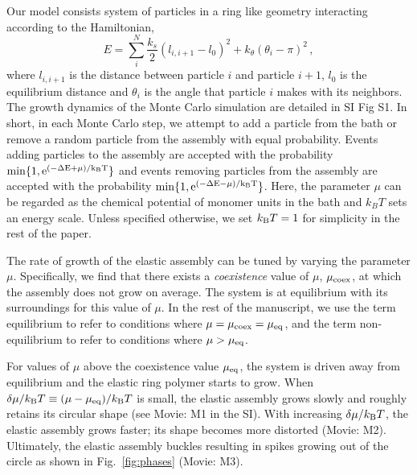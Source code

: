 \documentclass[amsmath,preprintnumbers,10pt,nofootinbib,prl,twocolumn]{revtex4-1}
\begin{document}
 Our model consists system of particles in a ring like geometry interacting according to the Hamiltonian, 
\begin{equation}
\label{eq:Halmitonianl}
E=\sum_i^N{\frac{k_s}{2}(l_{i,i+1}-l_0)^2+k_\theta(\theta_i-\pi)^2}\,,
\end{equation}
where $l_{i,i+1}$ is the distance between particle $i$ and particle $i+1$, $l_0$ is the equilibrium distance and $\theta_i$ is the angle that particle $i$ makes with its neighbors. The growth dynamics of the Monte Carlo simulation are detailed in SI Fig S1. In short, in each Monte Carlo step, we attempt to add a particle from the bath or remove a random particle from the assembly with equal probability.   Events adding particles to the assembly are accepted with the probability $\rm{min}\{1,e^{(-\Delta E +\mu)/k_{\rm B} T}\}$ and events removing particles from the assembly are accepted with the probability $\rm{min}\{1,e^{(-\Delta E -\mu)/k_{\rm B} T}\}$. Here, the parameter $\mu$ can be regarded as the chemical potential of monomer units in the bath and $k_B T$ sets an energy scale. Unless specified otherwise, we set $k_{\rm B} T = 1$ for simplicity in the rest of the paper. 

The rate of growth of the elastic assembly can be tuned by varying the parameter $\mu$. Specifically, we find that there exists a \textit{coexistence} value of $\mu$, $\mu_{\rm coex}$, at which the assembly does not grow on average. The system is at equilibrium with its surroundings for this value of $\mu$. In the rest of the manuscript, we use the term equilibrium to refer to conditions where $\mu =\mu_{\rm coex}=\mu_{\rm eq}$, and the term non-equilibrium to refer to conditions where $\mu > \mu_{\rm eq}$. 

For values of $\mu$ above the coexistence value $\mu_{\rm eq}$, the system is driven away from equilibrium and the elastic ring polymer starts to grow. When $\delta\mu/k_{\rm B}T \equiv (\mu-\mu_{\rm eq})/k_{\rm B} T$ is small, the elastic assembly grows slowly and roughly retains its circular shape (see Movie: M1 in the SI). With increasing $\delta\mu/k_{\rm B} T$, the elastic assembly grows faster; its shape becomes more distorted (Movie: M2). Ultimately, the elastic assembly buckles resulting in spikes growing out of the circle as shown in Fig.~\ref{fig:phases} (Movie: M3). 
\end{document}
